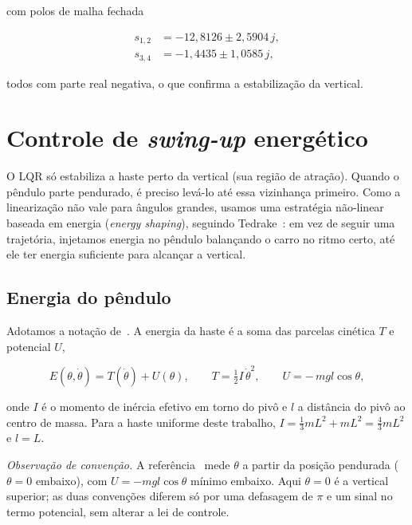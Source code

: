 \documentclass[brazil, 12pt]{article}
\begin{document}
com polos de malha fechada

\[
\begin{aligned}
s_{1,2} &= -12{,}8126 \pm 2{,}5904\,j, \\
s_{3,4} &= -1{,}4435 \pm 1{,}0585\,j,
\end{aligned}
\]

todos com parte real negativa, o que confirma a estabilização da vertical.

\section{Controle de \emph{swing-up} energético}

O LQR só estabiliza a haste perto da vertical (sua região de atração). Quando
o pêndulo parte pendurado, é preciso levá-lo até essa vizinhança primeiro.
Como a linearização não vale para ângulos grandes, usamos uma estratégia
não-linear baseada em energia (\emph{energy shaping}), seguindo Tedrake~\cite{mit}:
em vez de seguir uma trajetória, injetamos energia no pêndulo balançando o
carro no ritmo certo, até ele ter energia suficiente para alcançar a vertical.

\subsection{Energia do pêndulo}

Adotamos a notação de~\cite{mit}. A energia da haste é a soma das parcelas
cinética $T$ e potencial $U$,

\[
E(\theta,\dot{\theta}) = T(\dot{\theta}) + U(\theta),
\qquad
T = \tfrac{1}{2} I\,\dot{\theta}^{2},
\qquad
U = -\,m g l\cos\theta,
\]

onde $I$ é o momento de inércia efetivo em torno do pivô e $l$ a distância do
pivô ao centro de massa. Para a haste uniforme deste trabalho,
$I = \tfrac{1}{3}mL^{2} + mL^{2} = \tfrac{4}{3}mL^{2}$ e $l = L$.

\noindent\emph{Observação de convenção.} A referência~\cite{mit} mede $\theta$ a
partir da posição pendurada ($\theta=0$ embaixo), com $U=-mgl\cos\theta$ mínimo
embaixo. Aqui $\theta=0$ é a vertical superior; as duas convenções diferem só
por uma defasagem de $\pi$ e um sinal no termo potencial, sem alterar a lei de
controle.
\end{document}
